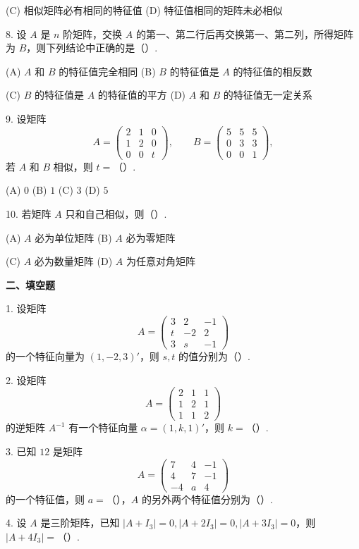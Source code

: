 \documentclass[UTF8,12pt,a4paper,fontset=fandol]{ctexart}
\begin{document}
(C) 相似矩阵必有相同的特征值 \qquad (D) 特征值相同的矩阵未必相似

8. 设 $A$ 是 $n$ 阶矩阵，交换 $A$ 的第一、第二行后再交换第一、第二列，所得矩阵为 $B$，则下列结论中正确的是（\quad ）.

(A) $A$ 和 $B$ 的特征值完全相同 \qquad (B) $B$ 的特征值是 $A$ 的特征值的相反数

(C) $B$ 的特征值是 $A$ 的特征值的平方 \qquad (D) $A$ 和 $B$ 的特征值无一定关系

9. 设矩阵
\[
A=\begin{pmatrix}2&1&0\\1&2&0\\0&0&t\end{pmatrix},\qquad
B=\begin{pmatrix}5&5&5\\0&3&3\\0&0&1\end{pmatrix},
\]
若 $A$ 和 $B$ 相似，则 $t=$（\quad ）.

(A) $0$ \qquad (B) $1$ \qquad (C) $3$ \qquad (D) $5$

10. 若矩阵 $A$ 只和自己相似，则（\quad ）.

(A) $A$ 必为单位矩阵 \qquad (B) $A$ 必为零矩阵

(C) $A$ 必为数量矩阵 \qquad (D) $A$ 为任意对角矩阵

\noindent\textbf{二、填空题}

1. 设矩阵
\[
A=\begin{pmatrix}3&2&-1\\ t&-2&2\\3&s&-1\end{pmatrix}
\]
的一个特征向量为 $(1,-2,3)'$，则 $s,t$ 的值分别为（\quad ）.

2. 设矩阵
\[
A=\begin{pmatrix}2&1&1\\1&2&1\\1&1&2\end{pmatrix}
\]
的逆矩阵 $A^{-1}$ 有一个特征向量 $\alpha=(1,k,1)'$，则 $k=$（\quad ）.

3. 已知 $12$ 是矩阵
\[
A=\begin{pmatrix}7&4&-1\\4&7&-1\\-4&a&4\end{pmatrix}
\]
的一个特征值，则 $a=$（\quad ），$A$ 的另外两个特征值分别为（\quad ）.

4. 设 $A$ 是三阶矩阵，已知 $|A+I_3|=0,|A+2I_3|=0,|A+3I_3|=0$，则 $|A+4I_3|=$（\quad ）.
\end{document}
